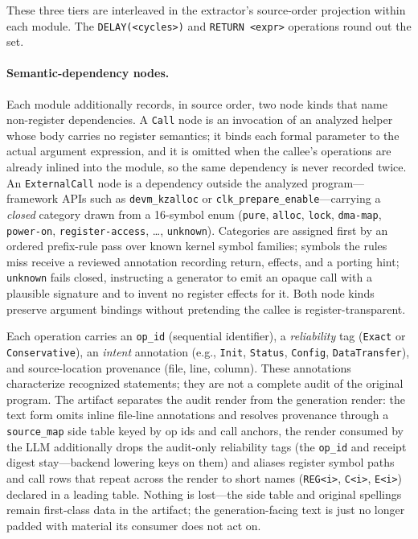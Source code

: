 These three tiers are interleaved in the extractor's source-order projection within each module. The \texttt{DELAY(<cycles>)} and \texttt{RETURN <expr>} operations round out the set.

\paragraph{Semantic-dependency nodes.}
Each module additionally records, in source order, two node kinds that name
non-register dependencies. A \texttt{Call} node is an invocation of an
analyzed helper whose body carries no register semantics; it binds each
formal parameter to the actual argument expression, and it is omitted when
the callee's operations are already inlined into the module, so the same
dependency is never recorded twice. An \texttt{ExternalCall} node is a
dependency outside the analyzed program---framework APIs such as
\texttt{devm\_kzalloc} or \texttt{clk\_prepare\_enable}---carrying a
\emph{closed} category drawn from a 16-symbol enum (\texttt{pure},
\texttt{alloc}, \texttt{lock}, \texttt{dma-map}, \texttt{power-on},
\texttt{register-access}, \ldots, \texttt{unknown}). Categories are assigned
first by an ordered prefix-rule pass over known kernel symbol families;
symbols the rules miss receive a reviewed annotation recording return,
effects, and a porting hint; \texttt{unknown} fails closed, instructing a
generator to emit an opaque call with a plausible signature and to invent no
register effects for it. Both node kinds preserve argument bindings without
pretending the callee is register-transparent.

Each operation carries an \texttt{op\_id} (sequential identifier), a
\emph{reliability} tag (\texttt{Exact} or \texttt{Conservative}), an
\emph{intent} annotation (e.g., \texttt{Init}, \texttt{Status},
\texttt{Config}, \texttt{DataTransfer}), and source-location provenance
(file, line, column). These annotations characterize recognized statements;
they are not a complete audit of the original program. The artifact
separates the audit render from the generation render: the text form omits
inline file-line annotations and resolves provenance through a
\texttt{source\_map} side table keyed by op ids and call anchors, the
render consumed by the LLM additionally drops the audit-only reliability
tags (the \texttt{op\_id} and receipt digest stay---backend lowering keys
on them) and aliases register symbol paths and call rows that repeat across
the render to short names (\texttt{REG<i>}, \texttt{C<i>}, \texttt{E<i>})
declared in a leading table. Nothing is lost---the side table and original
spellings remain first-class data in the artifact; the generation-facing
text is just no longer padded with material its consumer does not act on.

